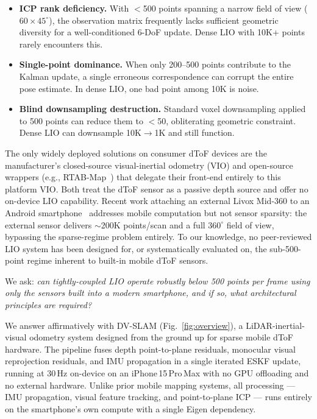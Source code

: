 \begin{itemize}
    \item[\textbf{F1.}] \textbf{ICP rank deficiency.}
    With $<$500 points spanning a narrow field of view ($60\times45^{\circ}$),
    the observation matrix frequently lacks sufficient geometric diversity
    for a well-conditioned 6-DoF update.
    Dense LIO with 10K+ points rarely encounters this.

    \item[\textbf{F2.}] \textbf{Single-point dominance.}
    When only 200--500 points contribute to the Kalman update,
    a single erroneous correspondence can corrupt the entire pose estimate.
    In dense LIO, one bad point among 10K is noise.

    \item[\textbf{F3.}] \textbf{Blind downsampling destruction.}
    Standard voxel downsampling applied to 500 points can reduce them
    to $<$50, obliterating geometric constraint.
    Dense LIO can downsample 10K$\rightarrow$1K and still function.
\end{itemize}

The only widely deployed solutions on consumer dToF devices are
the manufacturer's closed-source visual-inertial odometry (VIO) and
open-source wrappers (e.g., RTAB-Map~\cite{labbe2019rtabmap}) that
delegate their front-end entirely to this platform VIO.
Both treat the dToF sensor as a passive depth source and offer no
on-device LIO capability.
Recent work attaching an external Livox Mid-360 to an Android
smartphone~\cite{liu2025livoxphone} addresses mobile computation
but not sensor sparsity: the external sensor delivers ${\sim}$200K
points/scan and a full $360^{\circ}$ field of view, bypassing the
sparse-regime problem entirely.
To our knowledge, no peer-reviewed LIO system has been designed
for, or systematically evaluated on, the sub-500-point regime
inherent to built-in mobile dToF sensors.

We ask: \emph{can tightly-coupled LIO operate robustly below 500 points
per frame using only the sensors built into a modern smartphone,
and if so, what architectural principles are required?}

We answer affirmatively with DV-SLAM (Fig.~\ref{fig:overview}),
a LiDAR-inertial-visual odometry system designed from the ground up
for sparse mobile dToF hardware.
The pipeline fuses depth point-to-plane residuals, monocular visual
reprojection residuals, and IMU propagation in a single iterated ESKF
update, running at 30\,Hz on-device on an iPhone\,15\,Pro\,Max
with no GPU offloading and no external hardware.
Unlike prior mobile mapping systems, all processing — IMU propagation,
visual feature tracking, and point-to-plane ICP — runs entirely on
the smartphone's own compute with a single Eigen dependency.

